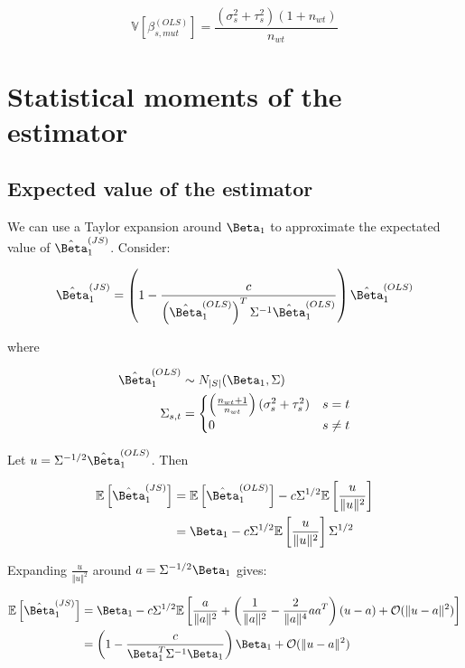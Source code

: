 \begin{equation}
  \mathbb{V} \left[\beta_{s, mut}^{(OLS)} \right] = \frac{(\sigma_s^2 + \tau_s^2)(1 + n_{wt})}{n_{wt}}
\end{equation}



\section{Statistical moments of the  estimator}
\label{sec:JS_moments}

\subsection{Expected value of the  estimator}

We can use a Taylor expansion around $\Beta_1$ to approximate the expectated value of $\hat{\Beta}_1^{(JS)}$.
Consider:

\begin{equation*}
  \hat{\Beta}_1^{(JS)} = \left( 1 - \frac{c}{\left( \hat{\Beta}_1^{(OLS)} \right)^T \Sigma^{-1} \hat{\Beta}_1^{(OLS)}} \right) \hat{\Beta}_1^{(OLS)}
\end{equation*}

where

\begin{align*}
  \hat{\Beta}_1^{(OLS)} &\sim N_{|S|}(\Beta_1, \Sigma) \\
  \Sigma_{s,t} &= \begin{cases}
    \left( \frac{n_{wt} + 1}{n_{wt}} \right) (\sigma_s^2 + \tau_s^2) & s = t\\
    0 & s \ne t
  \end{cases}
\end{align*}

Let $u = \Sigma^{-1/2}\hat{\Beta}_1^{(OLS)}$.
Then

\begin{align*}
  \mathbb{E}\left[ \hat{\Beta}_1^{(JS)} \right] &= \mathbb{E} \left[ \hat{\Beta}_1^{(OLS)} \right] - c\Sigma^{1/2}\mathbb{E} \left[ \frac{u}{\Vert u \Vert ^2} \right] \\
  &= \Beta_1 - c\Sigma^{1/2}\mathbb{E} \left[ \frac{u}{\Vert u \Vert ^2} \right] \Sigma^{1/2}\\
\end{align*}

Expanding $\frac{u}{\Vert u \Vert ^2}$ around $a = \Sigma^{-1/2}\Beta_1$ gives:

\begin{align*}
  \mathbb{E}\left[ \hat{\Beta}_1^{(JS)} \right]
  &= \Beta_1 - c\Sigma^{1/2}\mathbb{E} \left[ \frac{a}{\Vert a \Vert ^2} + \left( \frac{1}{\Vert a \Vert ^2}
    - \frac{2}{\Vert a \Vert ^4} aa^T\right)(u - a) + \mathcal{O}(\Vert u - a \Vert ^2)\right] \\
  & = \left(1 - \frac{c}{\Beta_1^T \Sigma^{-1} \Beta_1} \right) \Beta_1
    + \mathcal{O}(\Vert u - a \Vert ^2)
\end{align*}

